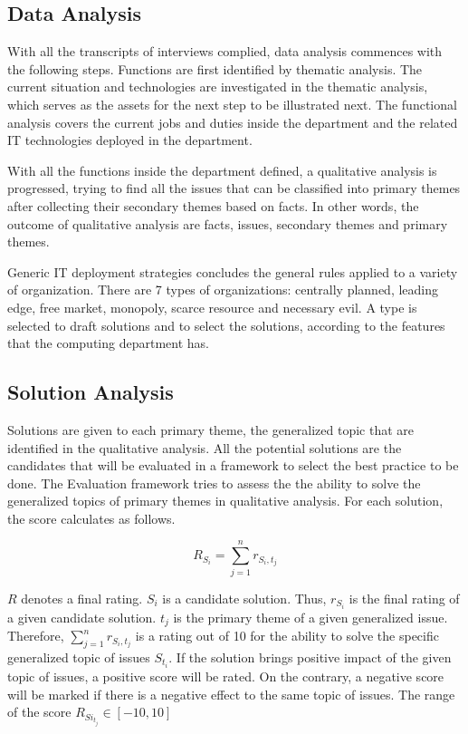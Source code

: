\subsection{Data Analysis}
With all the transcripts of interviews complied, data analysis commences with the following steps. 
Functions are first identified by thematic analysis. The current situation and technologies are investigated in the thematic analysis, which serves as the assets for the next step to be illustrated next. The functional analysis covers the current jobs and duties inside the department and the related IT technologies deployed in the department.

With all the functions inside the department defined, a qualitative analysis is progressed, trying to find all the issues that can be classified into primary themes after collecting their secondary themes based on facts. In other words, the outcome of qualitative analysis are facts, issues, secondary themes and primary themes.

Generic IT deployment strategies concludes the general rules applied to a variety of organization. There are 7 types of organizations: centrally planned, leading edge, free market, monopoly, scarce resource and necessary evil. A type is selected to draft solutions and to select the solutions, according to the features that the computing department has.

\subsection{Solution Analysis}
Solutions are given to each primary theme, the generalized topic that are identified in the qualitative analysis. All the potential solutions are the candidates that will be evaluated in a framework to select the best practice to be done.
The Evaluation framework tries to assess the the ability to solve the generalized topics of primary themes in qualitative analysis. For each solution, the score calculates as follows.

$$
R_{S_i} = \sum_{j=1}^n{r_{S_i, t_j}}
$$

$R$ denotes a final rating. $S_i$ is a candidate solution. Thus, $r_{S_i}$ is the final rating of a given candidate solution. $t_j$ is the primary theme of a given generalized issue. Therefore, $\sum_{j=1}^n{r_{S_i, t_j}}$ is a rating out of 10 for the ability to solve the specific generalized topic of issues $S_{t_i}$. If the solution brings positive impact of the given topic of issues, a positive score will be rated. On the contrary, a negative score will be marked if there is a negative effect to the same topic of issues. The range of the score $R_{Si_{t_j}} \in [-10, 10]$

